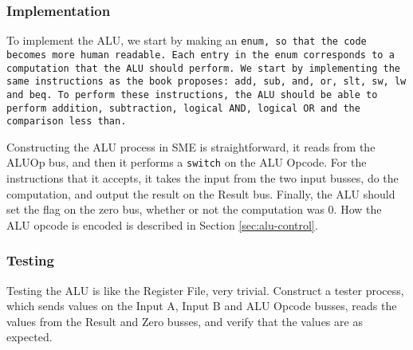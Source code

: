 \subsubsection*{Implementation}
To implement the ALU, we start by making an \tt{enum}, so that the code becomes
more human readable. Each entry in the \tt{enum} corresponds to a computation
that the ALU should perform. We start by implementing the same instructions as
the book proposes:  %
\texttt{add}, \texttt{sub}, \texttt{and}, \texttt{or}, \texttt{slt},
\texttt{sw}, \texttt{lw} and \texttt{beq}.  To perform these instructions, the
ALU should be able to perform addition, subtraction, logical \tt{AND}, logical
\tt{OR} and the comparison less than.

Constructing the ALU process in SME is straightforward, it reads from the ALUOp
bus, and then it performs a \texttt{switch} on the ALU Opcode. For the
instructions that it accepts, it takes the input from the two input busses, do
the computation, and output the result on the Result bus. Finally, the ALU
should set the flag on the zero bus, whether or not the computation was 0. How
the ALU opcode is encoded is described in Section \ref{sec:alu-control}.

\subsubsection*{Testing}
Testing the ALU is like the Register File, very trivial. Construct a tester
process, which sends values on the Input A, Input B and ALU Opcode busses,
reads the values from the Result and Zero busses, and verify that the values
are as expected.

